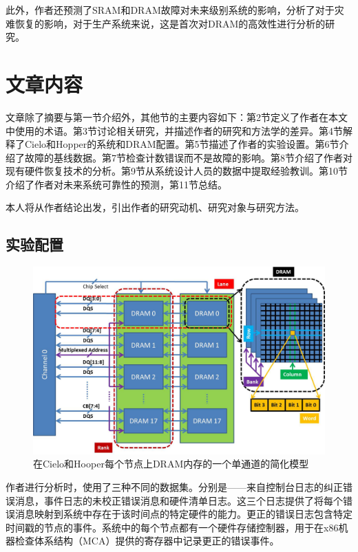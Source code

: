 \documentclass[11pt, a4paper]{article}
\begin{document}
此外，作者还预测了SRAM和DRAM故障对未来级别系统的影响，分析了对于灾难恢复的影响，对于生产系统来说，这是首次对DRAM的高效性进行分析的研究。

\section{文章内容}

文章除了摘要与第一节介绍外，其他节的主要内容如下：第2节定义了作者在本文中使用的术语。第3节讨论相关研究，并描述作者的研究和方法学的差异。第4节解释了Cielo和Hopper的系统和DRAM配置。第5节描述了作者的实验设置。第6节介绍了故障的基线数据。第7节检查计数错误而不是故障的影响。第8节介绍了作者对现有硬件恢复技术的分析。第9节从系统设计人员的数据中提取经验教训。第10节介绍了作者对未来系统可靠性的预测，第11节总结。

本人将从作者结论出发，引出作者的研究动机、研究对象与研究方法。

\subsection{实验配置}

\begin{figure}[H]
  \begin{center}
    \includegraphics[width=5in]{exp.png}
    \caption{在Cielo和Hooper每个节点上DRAM内存的一个单通道的简化模型} \label{fig:exp}
  \end{center}
\end{figure}

作者进行分析时，使用了三种不同的数据集。分别是——来自控制台日志的纠正错误消息，事件日志的未校正错误消息和硬件清单日志。这三个日志提供了将每个错误消息映射到系统中存在于该时间点的特定硬件的能力。更正的错误日志包含特定时间戳的节点的事件。系统中的每个节点都有一个硬件存储控制器，用于在x86机器检查体系结构（MCA）提供的寄存器中记录更正的错误事件。
\end{document}
